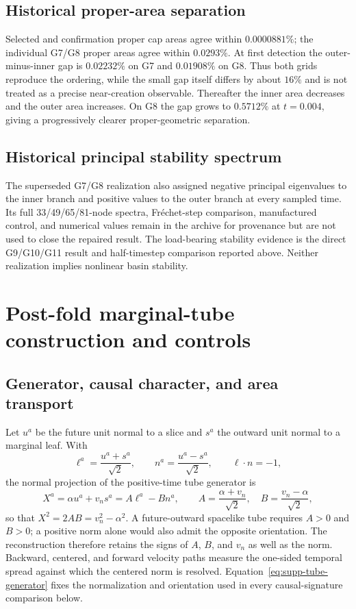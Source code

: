 \documentclass[11pt]{article}
\begin{document}
\subsection{Historical proper-area separation}

Selected and confirmation proper cap areas agree within $0.0000881\%$; the
individual G7/G8 proper areas agree within $0.0293\%$.  At first detection the
outer-minus-inner gap is $0.02232\%$ on G7 and $0.01908\%$ on G8.  Thus both
grids reproduce the ordering, while the small gap itself differs by about
$16\%$ and is not treated as a precise near-creation observable.  Thereafter
the inner area decreases and the outer area increases.  On G8 the gap grows to
$0.5712\%$ at $t=0.004$, giving a progressively clearer proper-geometric
separation.

\subsection{Historical principal stability spectrum}

The superseded G7/G8 realization also assigned negative principal eigenvalues
to the inner branch and positive values to the outer branch at every sampled
time.  Its full 33/49/65/81-node spectra, Fr\'echet-step comparison,
manufactured control, and numerical values remain in the archive for
provenance but are not used to close the repaired result.  The load-bearing
stability evidence is the direct G9/G10/G11 result and half-timestep
comparison reported above.  Neither realization implies nonlinear basin
stability.

\section{Post-fold marginal-tube construction and controls}

\subsection{Generator, causal character, and area transport}

Let $u^a$ be the future unit normal to a slice and $s^a$ the outward unit
normal to a marginal leaf.  With
\begin{equation}
\ell^a=\frac{u^a+s^a}{\sqrt2},\qquad
n^a=\frac{u^a-s^a}{\sqrt2},\qquad \ell\mathbin\cdot n=-1,
\end{equation}
the normal projection of the positive-time tube generator is
\begin{equation}
X^a=\alpha u^a+v_n s^a=A\ell^a-Bn^a,
\qquad
A=\frac{\alpha+v_n}{\sqrt2},\quad
B=\frac{v_n-\alpha}{\sqrt2},
\label{eq:supp-tube-generator}
\end{equation}
so that $X^2=2AB=v_n^2-\alpha^2$.  A future-outward spacelike tube requires
$A>0$ and $B>0$; a positive norm alone would also admit the opposite
orientation.  The reconstruction therefore retains the signs of $A$, $B$,
and $v_n$ as well as the norm.  Backward, centered, and forward velocity paths
measure the one-sided temporal spread against which the centered norm is
resolved.  Equation~\eqref{eq:supp-tube-generator} fixes the normalization and
orientation used in every causal-signature comparison below.
\end{document}
